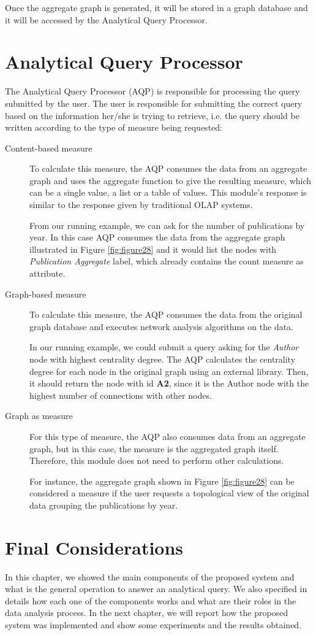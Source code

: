 Once the aggregate graph is generated, it will be stored in a graph database and it will be accessed by the Analytical Query Processor.

\section{Analytical Query Processor}

The Analytical Query Processor (AQP) is responsible for processing the query submitted by the user. The user is responsible for submitting the correct query based on the information her/she is trying to retrieve, i.e. the query should be written according to the type of measure being requested:
\begin{description}
\item[Content-based measure] To calculate this measure, the AQP consumes the data from an aggregate graph and uses the aggregate function to give the resulting measure, which can be a single value, a list or a table of values. This module's response is similar to the response given by traditional OLAP systems.

From our running example, we can ask for the number of publications by year. In this case AQP consumes the data from the aggregate graph illustrated in Figure \ref{fig:figure28} and it would list the nodes with \emph{Publication Aggregate} label, which already contains the count measure as attribute.

\item[Graph-based measure] To calculate this measure, the AQP consumes the data from the original graph database and executes network analysis algorithms on the data. 

In our running example, we could submit a query asking for the \emph{Author} node with highest centrality degree. The AQP calculates the centrality degree for each node in the original graph using an external library. Then, it should return the node with id \textbf{A2}, since it is the Author node with the highest number of connections with other nodes.

\item[Graph as measure] For this type of measure, the AQP also consumes data from an aggregate graph, but in this case, the measure is the aggregated graph itself. Therefore, this module does not need to perform other calculations.

For instance, the aggregate graph shown in Figure \ref{fig:figure28} can be considered a measure if the user requests a topological view of the original data grouping the publications by year.
\end{description}

\section{Final Considerations}
In this chapter, we showed the main components of the proposed system and what is the general operation to answer an analytical query. We also specified in details how each one of the components works and what are their roles in the data analysis process. In the next chapter, we will report how the proposed system was implemented and show some experiments and the results obtained.